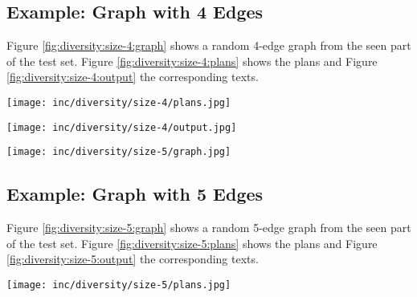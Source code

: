 \documentclass[11pt,a4paper]{article}
\begin{document}
\subsection{Example: Graph with 4 Edges}
Figure \ref{fig:diversity:size-4:graph} shows a random 4-edge graph from the seen part of the test set. Figure \ref{fig:diversity:size-4:plans} shows the plans and Figure \ref{fig:diversity:size-4:output} the corresponding texts.






\begin{sidewaysfigure*}
    \centering
    \texttt{[image: inc/diversity/size-4/plans.jpg]}
    \caption{25 random linearized plans (out of 1,295 possible plans) for the graph in Figure \ref{fig:diversity:size-4:graph}, and their ranks and model scores.}
    \label{fig:diversity:size-4:plans}
\end{sidewaysfigure*}

\begin{sidewaysfigure*}
    \centering
    \texttt{[image: inc/diversity/size-4/output.jpg]}
    \caption{Realizations of the plans from Figure \ref{fig:diversity:size-4:plans} as produced by the NMT realizer.}
    \label{fig:diversity:size-4:output}
\end{sidewaysfigure*}
 \clearpage
\begin{figure*}[!hb]
    \centering
    \texttt{[image: inc/diversity/size-5/graph.jpg]}
    \caption{Example of a graph with 5 edges}
    \label{fig:diversity:size-5:graph}
\end{figure*}


\subsection{Example: Graph with 5 Edges}
Figure \ref{fig:diversity:size-5:graph} shows a random 5-edge graph from the seen part of the test set. Figure \ref{fig:diversity:size-5:plans} shows the plans and Figure \ref{fig:diversity:size-5:output} the corresponding texts.








\begin{sidewaysfigure*}
    \centering
    \texttt{[image: inc/diversity/size-5/plans.jpg]}
    \caption{25 random linearized plans (out of 9,460 possible plans) for the graph in Figure \ref{fig:diversity:size-5:graph}, and their ranks and model scores.}
    \label{fig:diversity:size-5:plans}
\end{sidewaysfigure*}
\end{document}

